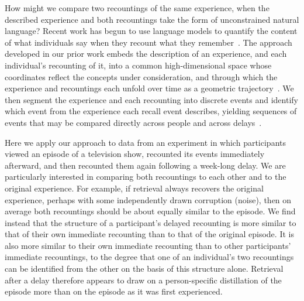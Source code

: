 \documentclass[10pt]{article}
\begin{document}
How might we compare two recountings of the same experience, when the described experience and both recountings take the form of unconstrained natural language?
Recent work has begun to use language models to quantify the content of what individuals say when they recount what they remember~\citep{HeusEtal21,MannEtal22,FitzEtal26,FeneEtal25,LeeChen22}.
The approach developed in our prior work embeds the description of an experience, and each individual's recounting of it, into a common high-dimensional space whose coordinates reflect the concepts under consideration, and through which the experience and recountings each unfold over time as a geometric trajectory~\citep[also see~\citealp{VeraEtal25}]{HeusEtal21,FitzEtal26}.
We then segment the experience and each recounting into discrete events and identify which event from the experience each recall event describes, yielding sequences of events that may be compared directly across people and across delays~\citep{ChenEtal17,BaldEtal17,HeusEtal21}.

Here we apply our approach to data from an experiment in which participants viewed an episode of a television show, recounted its events immediately afterward, and then recounted them again following a week-long delay.
We are particularly interested in comparing both recountings to each other and to the original experience.
For example, if retrieval always recovers the original experience, perhaps with some independently drawn corruption (noise), then on average both recountings should be about equally similar to the episode.
We find instead that the structure of a participant's delayed recounting is more similar to that of their own immediate recounting than to that of the original episode.
It is also more similar to their own immediate recounting than to other participants' immediate recountings, to the degree that one of an individual's two recountings can be identified from the other on the basis of this structure alone.
Retrieval after a delay therefore appears to draw on a person-specific distillation of the episode more than on the episode as it was first experienced.
\end{document}
